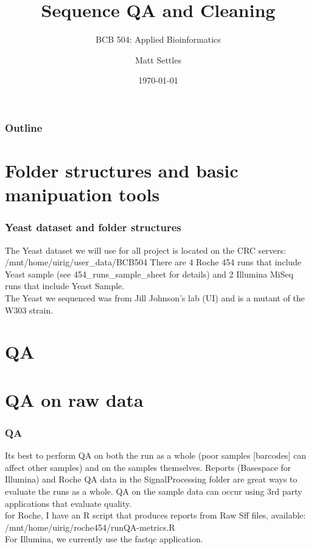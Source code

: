 \documentclass[pdf]{beamer}
\begin{document}
\title[Sequence Mapping]{Sequence QA and Cleaning}
\subtitle{BCB 504: Applied Bioinformatics\\}
\author[Matt Settles]{Matt Settles}
\date{\today}


\begin{frame}[plain]
  \titlepage
\end{frame}


\begin{frame}[plain] 
  \frametitle{Outline}
  \tableofcontents
\end{frame}

\section{Folder structures and basic manipuation tools}
\begin{frame}
  \frametitle{Yeast dataset and folder structures}
The Yeast dataset we will use for all project is located on the CRC servers:\\
\alert{/mnt/home/uirig/user\_data/BCB504}
\vspace{0.2in}
There are 4 Roche 454 runs that include Yeast sample (see 454\_runs\_sample\_sheet for details) and 2 Illumina MiSeq runs that include Yeast Sample.\\
\vspace{0.2in}
The Yeast we sequenced was from Jill Johnson's lab (UI) and is a mutant of the W303 strain.
\end{frame}

\section{QA}
\section{QA on raw data}
\begin{frame}
\frametitle{QA}
Its best to perform QA on both the run as a whole (poor samples [barcodes] can affect other samples) and on the samples themselves. Reports (Basespace for Illumina) and Roche QA data in the SignalProcessing folder are great ways to evaluate the runs as a whole.
\vspace{0.2in}
QA on the sample data can occur using 3rd party applications that evaluate quality.\\
for Roche, I have an R script that produces reports from Raw Sff files, available:\\
\alert{/mnt/home/uirig/roche454/runQA-metrics.R}\\
For Illumina, we currently use the fastqc application.\\
\end{frame}
\end{document}
